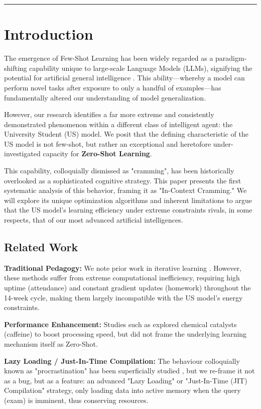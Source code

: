 \documentclass[11pt]{article}
\newcommand{\defitem}[1]{\vspace{0.8em}\noindent\textbf{#1}}
\begin{document}
\vspace{2em}
\rule{\linewidth}{0.5pt}
\vspace{2em}


\section{Introduction}
The emergence of Few-Shot Learning has been widely regarded as a paradigm-shifting capability unique to large-scale Language Models (LLMs), signifying the potential for artificial general intelligence \cite{brown2020language}. This ability—whereby a model can perform novel tasks after exposure to only a handful of examples—has fundamentally altered our understanding of model generalization.

However, our research identifies a far more extreme and consistently demonstrated phenomenon within a different class of intelligent agent: the University Student (US) model. We posit that the defining characteristic of the US model is not few-shot, but rather an exceptional and heretofore under-investigated capacity for \textbf{Zero-Shot Learning}.

This capability, colloquially dismissed as "cramming", has been historically overlooked as a sophisticated cognitive strategy. This paper presents the first systematic analysis of this behavior, framing it as "In-Context Cramming." We will explore its unique optimization algorithms and inherent limitations to argue that the US model's learning efficiency under extreme constraints rivals, in some respects, that of our most advanced artificial intelligences.

\subsection{Related Work}
\defitem{Traditional Pedagogy:} We note prior work in iterative learning \cite{textbook2020}. However, these methods suffer from extreme computational inefficiency, requiring high uptime (attendance) and constant gradient updates (homework) throughout the 14-week cycle, making them largely incompatible with the US model's energy constraints.

\defitem{Performance Enhancement:} Studies such as \cite{allnighter2023} explored chemical catalysts (caffeine) to boost processing speed, but did not frame the underlying learning mechanism itself as Zero-Shot.

\defitem{Lazy Loading / Just-In-Time Compilation:} The behaviour colloquially known as "procrastination" has been superficially studied \cite{procrast2021}, but we re-frame it not as a bug, but as a feature: an advanced "Lazy Loading" or "Just-In-Time (JIT) Compilation" strategy, only loading data into active memory when the query (exam) is imminent, thus conserving resources.
\end{document}
